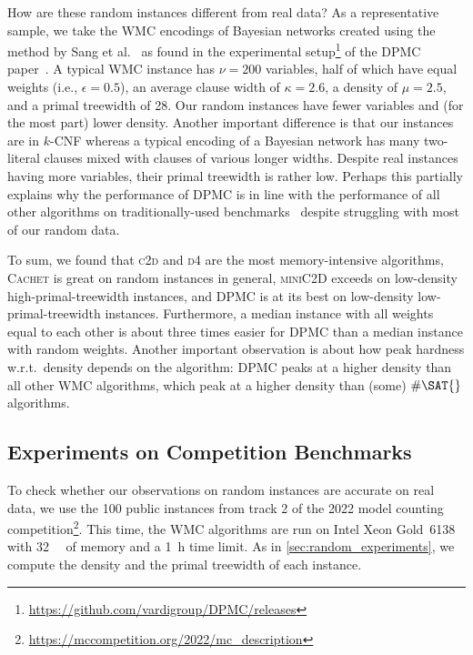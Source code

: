 \documentclass[runningheads]{llncs}
\begin{document}
How are these random instances different from real data? As a representative
sample, we take the \textsf{WMC} encodings of Bayesian networks created using
the method by Sang et al.~\cite{DBLP:conf/aaai/SangBK05} as found in the
experimental setup\footnote{\url{https://github.com/vardigroup/DPMC/releases}}
of the \textsc{DPMC} paper~\cite{DBLP:conf/cp/DudekPV20}. A typical \textsf{WMC}
instance has $\nu = 200$ variables, half of which have equal weights (i.e.,
$\epsilon = 0.5$), an average clause width of $\kappa = 2.6$, a density of
$\mu = 2.5$, and a primal treewidth of 28. Our random instances have fewer
variables and (for the most part) lower density. Another important difference is
that our instances are in $k$-CNF whereas a typical encoding of a Bayesian
network has many two-literal clauses mixed with clauses of various longer
widths. Despite real instances having more variables, their primal treewidth is
rather low. Perhaps this partially explains why the performance of \textsc{DPMC}
is in line with the performance of all other algorithms on traditionally-used
benchmarks~\cite{DBLP:conf/cp/DudekPV20} despite struggling with most of our
random data.

To sum, we found that \textsc{c2d} and \textsc{d4} are the most memory-intensive
algorithms, \textsc{Cachet} is great on random instances in general,
\textsc{miniC2D} exceeds on low-density high-primal-treewidth instances, and
\textsc{DPMC} is at its best on low-density low-primal-treewidth instances.
Furthermore, a median instance with all weights equal to each other is about
three times easier for \textsc{DPMC} than a median instance with random weights.
Another important observation is about how peak hardness w.r.t.\ density depends
on the algorithm: \textsc{DPMC} peaks at a higher density than all other
\textsf{WMC} algorithms, which peak at a higher density than (some) $\#\SAT{}$
algorithms.

\subsection{Experiments on Competition
  Benchmarks}\label{sec:benchmark_experiments}

To check whether our observations on random instances are accurate on real data,
we use the 100 public instances from track 2 of the 2022 model counting
competition\footnote{\url{https://mccompetition.org/2022/mc\_description}}. This
time, the \textsf{WMC} algorithms are run on Intel Xeon Gold~6138 with
\SI{32}{\gibi\byte} of memory and a \SI{1}{\hour} time limit. As in
\cref{sec:random_experiments}, we compute the density and the primal treewidth
of each instance.
\end{document}
